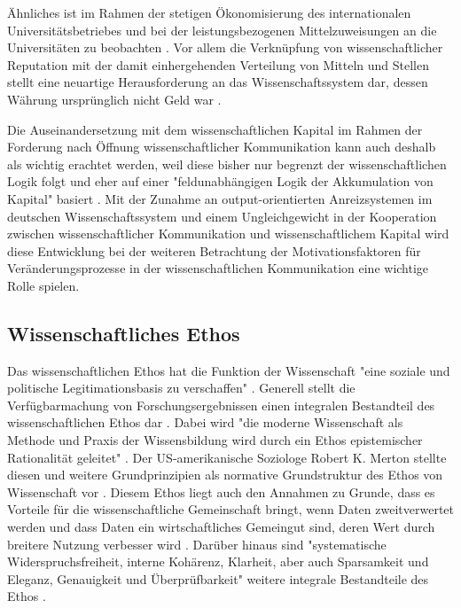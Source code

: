 Ähnliches ist im Rahmen der stetigen Ökonomisierung des internationalen Universitätsbetriebes \cite{brembs2015open} und bei der leistungsbezogenen Mittelzuweisungen an die Universitäten zu beobachten \cite[:12]{Neidhardt_2006}. Vor allem die Verknüpfung von wissenschaftlicher Reputation mit der damit einhergehenden Verteilung von Mitteln und Stellen stellt eine neuartige Herausforderung an das Wissenschaftssystem dar, dessen Währung ursprünglich nicht Geld war \cite{hanekop_2006}.

Die Auseinandersetzung mit dem wissenschaftlichen Kapital im Rahmen der Forderung nach Öffnung wissenschaftlicher Kommunikation kann auch deshalb als wichtig erachtet werden, weil diese bisher nur begrenzt der wissenschaftlichen Logik folgt und eher auf einer "feldunabhängigen Logik der Akkumulation von Kapital" basiert \cite{herb_2006}. Mit der Zunahme an output-orientierten Anreizsystemen im deutschen Wissenschaftssystem \cite{osterloh2008anreize} und einem Ungleichgewicht in der Kooperation zwischen wissenschaftlicher Kommunikation und wissenschaftlichem Kapital wird diese Entwicklung bei der weiteren Betrachtung der Motivationsfaktoren für Veränderungsprozesse in der wissenschaftlichen Kommunikation eine wichtige Rolle spielen.

\subsection{Wissenschaftliches Ethos}

Das wissenschaftlichen Ethos hat die Funktion der Wissenschaft "eine soziale und politische Legitimationsbasis zu verschaffen" \cite{descher_2012_ethos}. Generell stellt die Verfügbarmachung von Forschungsergebnissen einen integralen Bestandteil des wissenschaftlichen Ethos dar \cite{Fangerau_2014}. Dabei wird "die moderne Wissenschaft als Methode und Praxis der Wissensbildung wird durch ein Ethos epistemischer Rationalität geleitet" \cite{Oezmen_2015}. Der US-amerikanische Soziologe Robert K. Merton stellte diesen und weitere Grundprinzipien als normative Grundstruktur des Ethos von Wissenschaft vor \cite{Merton_1985}. Diesem Ethos liegt auch den Annahmen zu Grunde, dass es Vorteile für die wissenschaftliche Gemeinschaft bringt, wenn Daten zweitverwertet werden und dass Daten ein wirtschaftliches Gemeingut sind, deren Wert durch breitere Nutzung verbesser wird \cite{RIN_2010_open_research}. Darüber hinaus sind "systematische Widerspruchsfreiheit, interne Kohärenz, Klarheit, aber auch Sparsamkeit und Eleganz, Genauigkeit und Überprüfbarkeit" weitere integrale Bestandteile des Ethos \cite{Oezmen_2015}.

